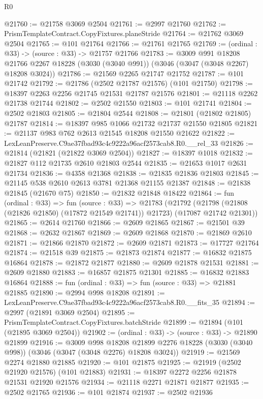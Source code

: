 \begin{lexlean}{R0}
\begin{coremodule}
@21760 := @21758 @3069 @2504
@21761 := @2997 @21760
@21762 := PrismTemplateContract.CopyFixtures.planeStride
@21764 := @21762 @3069 @2504
@21765 := @101 @21764
@21766 := @21761 @21765
@21769 := (ordinal : @33) -> (source : @33) -> @21757 @21766
@21783 := @3009
    @991
    @18208
    @21766
    @2267
    @18228
    (@3030 (@3040 @991))
    (@3046 (@3047 (@3048 @2267) @18208 @3024))
@21786 := @21569 @2265 @21747 @21752
@21787 := @101 @21742
@21792 := @21786 (@2502 @21787 @21576) (@101 @21750)
@21798 := @18397 @2263 @2256 @21745 @21531 @21787 @21576
@21801 := @21118 @2262 @21738 @21744
@21802 := @2502 @21550
@21803 := @101 @21741
@21804 := @2502 @21803
@21805 := @21804 @2544
@21808 := @21801 (@21802 @21805) @21787
@21814 := @18397 @985 @1066 @21732 @21737 @21550 @21805
@21821 := @21137 @983 @762 @2613 @21545 @18208 @21550 @21622
@21822 := LexLeanPreserve.C9ae37fbad93c4c9222a96acf2573cab8.R0.__rel_33
@21826 := @21814 (@21821 (@21822 @3069 @2504))
@21827 := @18397 @1018
@21832 := @21827 @112 @21735 @2610 @21803 @2544
@21835 := @21653 @1017 @2631 @21734
@21836 := @4358 @21368
@21838 := @21835 @21836 @21803
@21845 := @21145 @538 @2610 @2613 @3781 @21368 @21155 @21387
@21848 := @21838 @21845 (@21670 @75)
@21850 := @21832 @21848 @18422
@21864 := fun (ordinal : @33) =>
  fun (source : @33) =>
  @21783
    (@21792 (@21798 (@21808 (@21826 @21850) (@17872 @21549 @21741)) @21723) (@17087 @21742 @21301))
@21865 := @2614 @21760
@21866 := @2609 @21865
@21867 := @21501 @39
@21868 := @2632 @21867
@21869 := @2609 @21868
@21870 := @21869 @2610
@21871 := @21866 @21870
@21872 := @2609 @21871
@21873 := @17727 @21764
@21874 := @21518 @39
@21875 := @21873 @21874
@21877 := @16832 @21875 @16864
@21878 := @21872 @21877
@21880 := @2609 @21878 @21531
@21881 := @2609 @21880
@21883 := @16857 @21875 @21301
@21885 := @16832 @21883 @16864
@21888 := fun (ordinal : @33) => fun (source : @33) => @21881 @21885
@21890 := @2994 @998 @18208
@21891 := LexLeanPreserve.C9ae37fbad93c4c9222a96acf2573cab8.R0.__fits_35
@21894 := @2997 (@21891 @3069 @2504)
@21895 := PrismTemplateContract.CopyFixtures.batchStride
@21899 := @21894 (@101 (@21895 @3069 @2504))
@21902 := (ordinal : @33) -> (source : @33) -> @21890 @21899
@21916 := @3009
    @998
    @18208
    @21899
    @2276
    @18228
    (@3030 (@3040 @998))
    (@3046 (@3047 (@3048 @2276) @18208 @3024))
@21919 := @21569 @2274 @21880 @21885
@21920 := @101 @21875
@21925 := @21919 (@2502 @21920 @21576) (@101 @21883)
@21931 := @18397 @2272 @2256 @21878 @21531 @21920 @21576
@21934 := @21118 @2271 @21871 @21877
@21935 := @2502 @21765
@21936 := @101 @21874
@21937 := @2502 @21936

\end{coremodule}
\end{lexlean}
